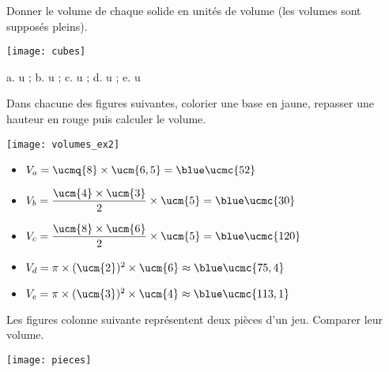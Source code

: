 \exercicesbase

\begin{colonne*exercice}


\begin{exercice} %
   Donner le volume de chaque solide en unités de volume (les volumes sont supposés pleins).
   \begin{center}
      \texttt{[image: cubes]}
   \end{center}
\end{exercice}

\begin{corrige}
  a. { u} \quad ; b. { u} \quad ; c. { u} \quad ; d. { u} \quad ; e. { u}
\end{corrige}



\begin{exercice} %
   Dans chacune des figures suivantes, colorier une base en jaune, repasser une hauteur en rouge puis calculer le volume.
   \begin{center}
      \texttt{[image: volumes\_ex2]}
   \end{center}
\end{exercice}

\begin{corrige}
   \begin{itemize}
      \item $V_a =\ucmq{8}\times\ucm{6,5} ={\blue \ucmc{52}}$ \smallskip
      \item $V_b =\dfrac{\ucm{4}\times\ucm{3}}{2}\times\ucm{5} ={\blue \ucmc{30}}$ \smallskip
      \item $V_c =\dfrac{\ucm{8}\times\ucm{6}}{2}\times\ucm{5} ={\blue \ucmc{120}}$ \smallskip
      \item $V_d =\pi\times(\ucm{2})^2\times\ucm{6} \approx{\blue \ucmc{75,4}}$ \smallskip
      \item $V_e =\pi\times(\ucm{3})^2\times\ucm{4} \approx{\blue \ucmc{113,1}}$
   \end{itemize}
\end{corrige}


\begin{exercice} %
   Les figures colonne suivante représentent deux pièces d'un jeu. Comparer leur volume.
   \begin{center}
      \texttt{[image: pieces]}
   \end{center}
\end{exercice}


\end{colonne*exercice}
